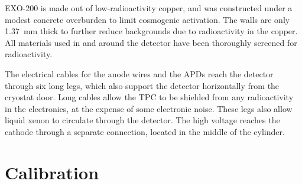 \documentclass[herrin-thesis.tex]{subfiles}
\begin{document}
EXO-200 is made out of low-radioactivity copper, and was constructed under a modest concrete overburden to limit cosmogenic activation. The walls are only \SI{1.37}{\mm} thick to further reduce backgrounds due to radioactivity in the copper. All materials used in and around the detector have been thoroughly screened for radioactivity\cite{Leonard:2008uq}.

The electrical cables for the anode wires and the APDs reach the detector through six long legs, which also support the detector horizontally from the cryostat door. Long cables allow the TPC to be shielded from any radioactivity in the electronics, at the expense of some electronic noise. These legs also allow liquid xenon to circulate through the detector. The high voltage reaches the cathode through a separate connection, located in the middle of the cylinder.

\section{Calibration}
\label{sec:detector_calibration}
\end{document}
